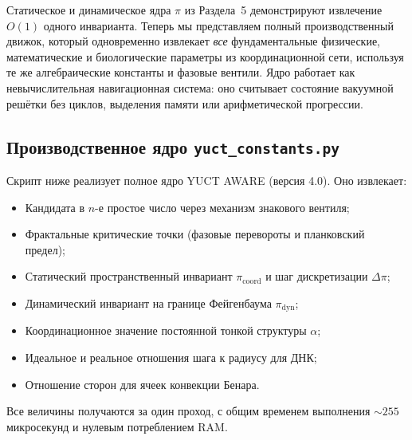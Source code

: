 \documentclass[12pt,a4paper]{article}
\begin{document}
	Статическое и динамическое ядра $\pi$ из Раздела~5 демонстрируют извлечение $O(1)$ одного инварианта. Теперь мы представляем полный производственный движок, который одновременно извлекает \emph{все} фундаментальные физические, математические и биологические параметры из координационной сети, используя те же алгебраические константы и фазовые вентили. Ядро работает как невычислительная навигационная система: оно считывает состояние вакуумной решётки без циклов, выделения памяти или арифметической прогрессии.
	
	\subsection{Производственное ядро \texttt{yuct\_constants.py}}
	
	Скрипт ниже реализует полное ядро YUCT AWARE (версия 4.0). Оно извлекает:
	\begin{itemize}
		\item Кандидата в $n$-е простое число через механизм знакового вентиля;
		\item Фрактальные критические точки (фазовые перевороты и планковский предел);
		\item Статический пространственный инвариант $\pi_{\mathrm{coord}}$ и шаг дискретизации $\Delta\pi$;
		\item Динамический инвариант на границе Фейгенбаума $\pi_{\mathrm{dyn}}$;
		\item Координационное значение постоянной тонкой структуры $\alpha$;
		\item Идеальное и реальное отношения шага к радиусу для ДНК;
		\item Отношение сторон для ячеек конвекции Бенара.
	\end{itemize}
	Все величины получаются за один проход, с общим временем выполнения $\sim 255$ микросекунд и нулевым потреблением RAM.
	
\end{document}
